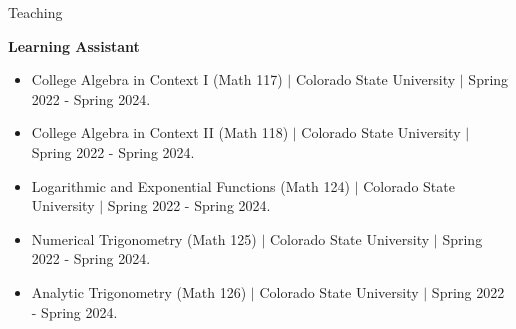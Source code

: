 \documentclass[
	11pt, %
]{resume} %
\begin{document}

	



	


\begin{rSection}{Teaching}


	\textbf{Learning Assistant}
	\begin{itemize}
		\item{College Algebra in Context I (Math 117) $\mid$ Colorado State University $\mid$ Spring 2022 - Spring 2024.}
		\item{College Algebra in Context II (Math 118) $\mid$ Colorado State University $\mid$ Spring 2022 - Spring 2024.}
		\item{Logarithmic and Exponential Functions (Math 124) $\mid$ Colorado State University $\mid$ Spring 2022 - Spring 2024.}
		\item{Numerical Trigonometry (Math 125) $\mid$ Colorado State University $\mid$ Spring 2022 - Spring 2024.}
		\item{Analytic Trigonometry (Math 126) $\mid$ Colorado State University $\mid$ Spring 2022 - Spring 2024.}
	\end{itemize}
	
\end{rSection}
\end{document}
